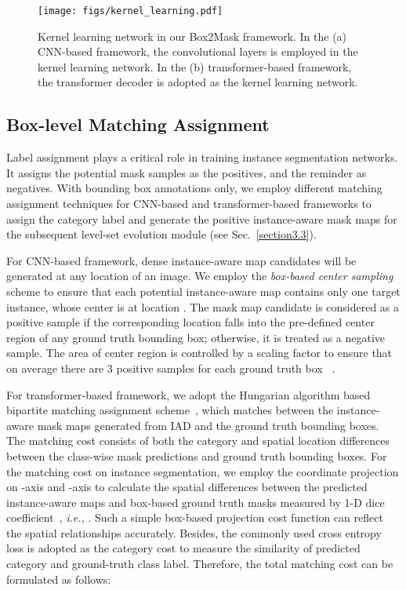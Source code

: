 \documentclass[12pt,onecolumn,letterpaper]{article}
\begin{document}
\begin{figure}[t]
	\centering
	\texttt{[image: figs/kernel\_learning.pdf]}
	\caption{Kernel learning network in our Box2Mask framework. In the (a) CNN-based framework, the convolutional layers is employed in the kernel learning network. In the (b) transformer-based framework, the transformer decoder is adopted as the kernel learning network.}
	\label{fig:kernellearning}
\end{figure}

\subsection{Box-level Matching Assignment} 
Label assignment plays a critical role in training instance segmentation networks. It assigns the potential mask samples as the positives, and the reminder as negatives. With bounding box annotations only, we employ different matching assignment techniques for CNN-based and transformer-based frameworks to assign the category label and generate the positive instance-aware mask maps for the subsequent level-set evolution module (see Sec.~\ref{section3.3}).

For CNN-based framework, dense instance-aware map candidates will be generated at any location  of an image. We employ the \textit{box-based center sampling} scheme to ensure that each potential instance-aware map contains only one target instance, whose center is at location . The mask map candidate is considered as a positive sample if the corresponding location  falls into the pre-defined center region of any ground truth bounding box; otherwise, it is treated as a negative sample. The area of center region is controlled by a scaling factor to ensure that on average there are 3 positive samples for each ground truth box ~\cite{wang2020solov2}.

For transformer-based framework, we adopt the Hungarian algorithm based bipartite matching assignment scheme~\cite{eccv2020-detr}, which matches between the instance-aware mask maps generated from IAD and the ground truth bounding boxes. 
The matching cost consists of both the category and spatial location differences between the class-wise mask predictions and ground truth bounding boxes.
For the matching cost  on instance segmentation, we employ the coordinate projection  on -axis and -axis to calculate the spatial differences between the predicted instance-aware maps   and box-based ground truth masks  measured by 1-D dice coefficient~\cite{ic3dv2016_dice_loss}, \textit{i.e.,} . 
Such a simple box-based projection cost function can reflect the spatial relationships accurately.
Besides, the commonly used cross entropy loss is adopted as the category cost   to measure the similarity of predicted category and ground-truth class label. Therefore, the total matching cost  can be formulated as follows: 
\end{document}

